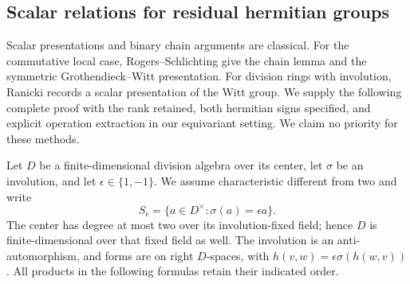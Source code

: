 \subsection{Scalar relations for residual hermitian groups}

Scalar presentations and binary chain arguments are classical.
For the commutative local case, Rogers--Schlichting
\cite[Theorems 1.2--1.3, pp.2--3]{C-RogersSchlichting2024}
give the chain lemma and the symmetric Grothendieck--Witt presentation.
For division rings with involution, Ranicki
\cite[Proposition 22.8, p.230]{C-Ranicki1992}
records a scalar presentation of the Witt group.
We supply the following complete proof with the rank retained,
both hermitian signs specified, and explicit operation extraction
in our equivariant setting. We claim no priority for these methods.

Let $D$ be a finite-dimensional division algebra over its center,
let $\sigma$ be an involution, and let $\epsilon\in\{1,-1\}$.
We assume characteristic different from two and write
\[
 S_\epsilon=\{a\in D^\times:\sigma(a)=\epsilon a\}.
\]
The center has degree at most two over its involution-fixed field;
hence $D$ is finite-dimensional over that fixed field as well.
The involution is an anti-automorphism, and forms are on right
$D$-spaces, with $h(v,w)=\epsilon\sigma(h(w,v))$.
All products in the following formulas retain their indicated order.

